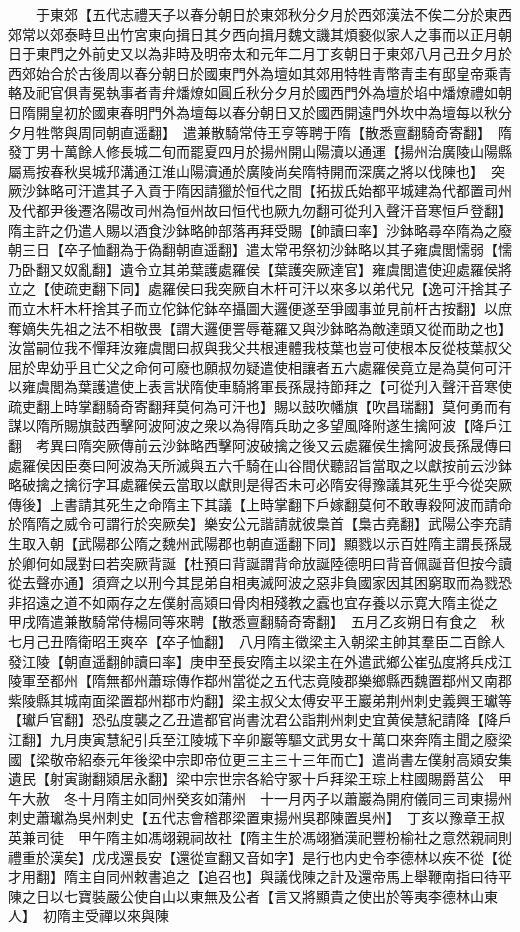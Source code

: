 　　于東郊【五代志禮天子以春分朝日於東郊秋分夕月於西郊漢法不俟二分於東西郊常以郊泰畤旦出竹宮東向揖日其夕西向揖月魏文譏其煩褻似家人之事而以正月朝日于東門之外前史又以為非時及明帝太和元年二月丁亥朝日于東郊八月己丑夕月於西郊始合於古後周以春分朝日於國東門外為壇如其郊用特牲青幣青圭有邸皇帝乘青輅及祀官俱青冕執事者青弁燔燎如圓丘秋分夕月於國西門外為壇於埳中燔燎禮如朝日隋開皇初於國東春明門外為壇每以春分朝日又於國西開遠門外坎中為壇每以秋分夕月牲幣與周同朝直遥翻】　遣兼散騎常侍王亨等聘于隋【散悉亶翻騎奇寄翻】　隋發丁男十萬餘人修長城二旬而罷夏四月於揚州開山陽瀆以通運【揚州治廣陵山陽縣屬焉按春秋吳城䢴溝通江淮山陽瀆通於廣陵尚矣隋特開而深廣之將以伐陳也】　突厥沙鉢略可汗遣其子入貢于隋因請獵於恒代之間【拓拔氏始都平城建為代都置司州及代都尹後遷洛陽改司州為恒州故曰恒代也厥九勿翻可從刋入聲汗音寒恒戶登翻】隋主許之仍遣人賜以酒食沙鉢略帥部落再拜受賜【帥讀曰率】沙鉢略尋卒隋為之廢朝三日【卒子恤翻為于偽翻朝直遥翻】遣太常弔祭初沙鉢略以其子雍虞閭懦弱【懦乃卧翻又奴亂翻】遺令立其弟葉護處羅侯【葉護突厥達官】雍虞閭遣使迎處羅侯將立之【使疏吏翻下同】處羅侯曰我突厥自木杆可汗以來多以弟代兄【逸可汗捨其子而立木杆木杆捨其子而立佗鉢佗鉢卒攝圖大邏便遂至爭國事並見前杆古按翻】以庶奪嫡失先祖之法不相敬畏【謂大邏便詈辱菴羅又與沙鉢略為敵達頭又從而助之也】汝當嗣位我不憚拜汝雍虞閭曰叔與我父共根連體我枝葉也豈可使根本反從枝葉叔父屈於卑幼乎且亡父之命何可廢也願叔勿疑遣使相讓者五六處羅侯竟立是為莫何可汗以雍虞閭為葉護遣使上表言狀隋使車騎將軍長孫晟持節拜之【可從刋入聲汗音寒使疏吏翻上時掌翻騎奇寄翻拜莫何為可汗也】賜以鼓吹幡旗【吹昌瑞翻】莫何勇而有謀以隋所賜旗鼓西擊阿波阿波之衆以為得隋兵助之多望風降附遂生擒阿波【降戶江翻　考異曰隋突厥傳前云沙鉢略西擊阿波破擒之後又云處羅侯生擒阿波長孫晟傳曰處羅侯因臣奏曰阿波為天所滅與五六千騎在山谷間伏聽詔旨當取之以獻按前云沙鉢略破擒之擒衍字耳處羅侯云當取以獻則是得否未可必隋安得豫議其死生乎今從突厥傳後】上書請其死生之命隋主下其議【上時掌翻下戶嫁翻莫何不敢專殺阿波而請命於隋隋之威令可謂行於突厥矣】樂安公元諧請就彼梟首【梟古堯翻】武陽公李充請生取入朝【武陽郡公隋之魏州武陽郡也朝直遥翻下同】顯戮以示百姓隋主謂長孫晟於卿何如晟對曰若突厥背誕【杜預曰背誕謂背命放誕陸德明曰背音佩誕音但按今讀從去聲亦通】須齊之以刑今其昆弟自相夷滅阿波之惡非負國家因其困窮取而為戮恐非招遠之道不如兩存之左僕射高熲曰骨肉相殘教之蠧也宜存養以示寛大隋主從之　甲戌隋遣兼散騎常侍楊同等來聘【散悉亶翻騎奇寄翻】　五月乙亥朔日有食之　秋七月己丑隋衛昭王爽卒【卒子恤翻】　八月隋主徵梁主入朝梁主帥其羣臣二百餘人發江陵【朝直遥翻帥讀曰率】庚申至長安隋主以梁主在外遣武鄉公崔弘度將兵戍江陵軍至都州【隋無都州蕭琮傳作鄀州當從之五代志竟陵郡樂鄉縣西魏置鄀州又南郡紫陵縣其城南面梁置鄀州鄀市灼翻】梁主叔父太傅安平王巖弟荆州刺史義興王瓛等【瓛戶官翻】恐弘度襲之乙丑遣都官尚書沈君公詣荆州刺史宜黄侯慧紀請降【降戶江翻】九月庚寅慧紀引兵至江陵城下辛卯巖等驅文武男女十萬口來奔隋主聞之廢梁國【梁敬帝紹泰元年後梁中宗即帝位更三主三十三年而亡】遣尚書左僕射高熲安集遺民【射寅謝翻熲居永翻】梁中宗世宗各給守冢十戶拜梁王琮上柱國賜爵莒公　甲午大赦　冬十月隋主如同州癸亥如蒲州　十一月丙子以蕭巖為開府儀同三司東揚州刺史蕭瓛為吳州刺史【五代志會稽郡梁置東揚州吳郡陳置吳州】　丁亥以豫章王叔英兼司徒　甲午隋主如馮翊親祠故社【隋主生於馮翊猶漢祀豐枌榆社之意然親祠則禮重於漢矣】戊戌還長安【還從宣翻又音如字】是行也内史令李德林以疾不從【從才用翻】隋主自同州敕書追之【追召也】與議伐陳之計及還帝馬上舉鞭南指曰待平陳之日以七寶裝嚴公使自山以東無及公者【言又將顯貴之使出於等夷李德林山東人】　初隋主受禪以來與陳